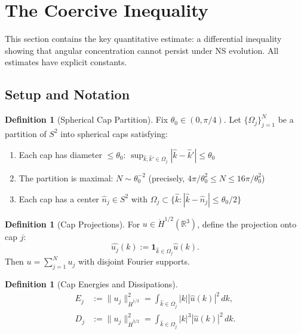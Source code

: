 \documentclass[11pt]{article}
\theoremstyle{definition}
\newtheorem{definition}[theorem]{Definition}
\newcommand{\R}{\mathbb{R}}
\begin{document}
\section{The Coercive Inequality}\label{sec:coercive}

This section contains the key quantitative estimate: a differential inequality showing that angular concentration cannot persist under NS evolution. All estimates have explicit constants.

\subsection{Setup and Notation}

\begin{definition}[Spherical Cap Partition]
Fix $\theta_0 \in (0, \pi/4)$. Let $\{\Omega_j\}_{j=1}^N$ be a partition of $S^2$ into spherical caps satisfying:
\begin{enumerate}
\item Each cap has diameter $\leq \theta_0$: $\sup_{\hat{k}, \hat{k}' \in \Omega_j} |\hat{k} - \hat{k}'| \leq \theta_0$
\item The partition is maximal: $N \sim \theta_0^{-2}$ (precisely, $4\pi/\theta_0^2 \leq N \leq 16\pi/\theta_0^2$)
\item Each cap has a center $\hat{n}_j \in S^2$ with $\Omega_j \subset \{\hat{k} : |\hat{k} - \hat{n}_j| \leq \theta_0/2\}$
\end{enumerate}
\end{definition}

\begin{definition}[Cap Projections]
For $u \in \dot{H}^{1/2}(\R^3)$, define the projection onto cap $j$:
\begin{equation}
\widehat{u_j}(k) := \mathbf{1}_{\hat{k} \in \Omega_j} \hat{u}(k).
\end{equation}
Then $u = \sum_{j=1}^N u_j$ with disjoint Fourier supports.
\end{definition}

\begin{definition}[Cap Energies and Dissipations]
\begin{align}
E_j &:= \|u_j\|_{\dot{H}^{1/2}}^2 = \int_{\hat{k} \in \Omega_j} |k| |\hat{u}(k)|^2 \, dk, \\
D_j &:= \|u_j\|_{\dot{H}^{3/2}}^2 = \int_{\hat{k} \in \Omega_j} |k|^3 |\hat{u}(k)|^2 \, dk.
\end{align}
\end{definition}
\end{document}
